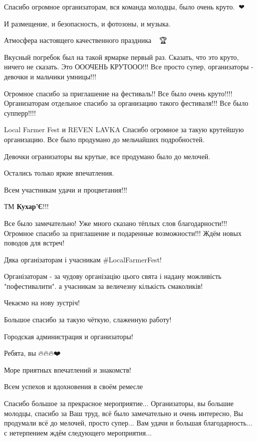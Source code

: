Спасибо огромное организаторам, вся команда молодцы, было очень круто.💪🔥❤

И размещение, и безопасность, и фотозоны, и музыка.

Атмосфера настоящего качественного праздника💯💥🎊🎉🏆


Вкусный погребок был на такой ярмарке первый раз. Сказать, что это круто,
ничего не сказать. Это ОООЧЕНЬ КРУТООО!!! Все просто супер, организаторы -
девочки и мальчики умницы!!!


Огромное спасибо за приглашение на фестиваль!! Все было очень
круто!!!! Организаторам отдельное спасибо за организацию такого фестиваля!!! Все
было супперр!!!!


Local Farmer Fest и REVEN LAVKA Спасибо огромное за такую крутейшую
организацию. Все было продумано до мельчайших подробностей.

Девочки огранизаторы вы крутые, все продумано было до мелочей.

Остались только яркие впечатления.

Всем участникам удачи и процветания!!!

ТМ \textbf{Кухар'Є}!!!


Все было замечательно! Уже много сказано тёплых слов благодарности!!! Огромное
спасибо за приглашение и подаренные возможности!!! Ждём новых поводов для
встреч! 🤩 💖


Дяка організаторам і учасникам \#LocalFarmerFest!

Організаторам - за чудову організацію цього свята і надану можливість
"пофестивалити". а учасникам за величезну кількість смаколиків!

Чекаємо на нову зустріч!


Большое спасибо за такую чёткую, слаженную работу!

Городская администрация и организаторы!

Ребята, вы 🔥🔥🔥❤️

Море приятных впечатлений и знакомств!

Всем успехов и вдохновения в своём ремесле 💫✨🚀


Спасибо большое за прекрасное мероприятие... Организаторы, вы большие
молодцы, спасибо за Ваш труд, всё было замечательно и очень интересно, Вы
продумали всё до мелочей, просто супер... Вам удачи и большая благодарность... с
нетерпением ждём следующего мероприятия...🤗

